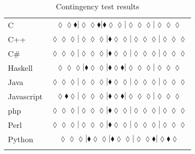 \begin{table*}
{\begin{tabular}{l c}
C & $\scriptscriptstyle\lozenge\lozenge\blacklozenge|\lozenge\lozenge\blacklozenge|\blacklozenge\lozenge\lozenge|\lozenge\lozenge\lozenge|\lozenge\lozenge\lozenge$ \\
C++ & $\scriptscriptstyle\lozenge\lozenge\lozenge|\lozenge\lozenge\lozenge|\blacklozenge\lozenge\lozenge|\lozenge\lozenge\lozenge|\lozenge\lozenge\lozenge$ \\
C\# & $\scriptscriptstyle\lozenge\lozenge\lozenge|\lozenge\lozenge\lozenge|\blacklozenge\lozenge\lozenge|\lozenge\lozenge\lozenge|\lozenge\lozenge\lozenge$ \\
Haskell & $\scriptscriptstyle\lozenge\lozenge\lozenge|\blacklozenge\lozenge\lozenge|\blacklozenge\lozenge\blacklozenge|\lozenge\lozenge\lozenge|\lozenge\lozenge\lozenge$ \\
Java & $\scriptscriptstyle\lozenge\lozenge\lozenge|\lozenge\lozenge\lozenge|\blacklozenge\lozenge\lozenge|\lozenge\lozenge\lozenge|\lozenge\lozenge\lozenge$ \\
Javascript & $\scriptscriptstyle\lozenge\blacklozenge\lozenge|\lozenge\lozenge\lozenge|\blacklozenge\lozenge\blacklozenge|\lozenge\lozenge\lozenge|\lozenge\lozenge\lozenge$ \\
{\sc php} & $\scriptscriptstyle\lozenge\lozenge\lozenge|\lozenge\lozenge\lozenge|\blacklozenge\lozenge\lozenge|\lozenge\lozenge\lozenge|\lozenge\lozenge\lozenge$ \\
Perl & $\scriptscriptstyle\lozenge\lozenge\lozenge|\lozenge\lozenge\lozenge|\blacklozenge\lozenge\lozenge|\lozenge\lozenge\lozenge|\lozenge\lozenge\lozenge$ \\
Python & $\scriptscriptstyle\lozenge\lozenge\lozenge|\blacklozenge\lozenge\lozenge|\blacklozenge\lozenge\lozenge|\lozenge\lozenge\blacklozenge|\lozenge\blacklozenge\lozenge$ \\

\hline
& \\
\end{tabular}
}
\caption{Contingency test results}
\label{tbl:contingency-test-results}
\end{table*}
